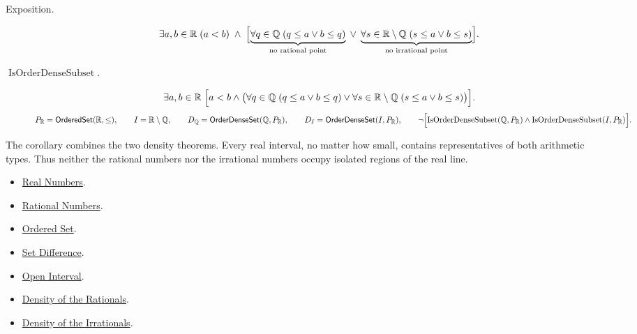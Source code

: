 \begin{remark*}
\begin{description}
\item[Exposition.]
\[
\exists a,b\in\mathbb{R}\;(a<b)
\;\land\;
\Bigl[
\underbrace{\forall q\in\mathbb{Q}\;(q\le a\lor b\le q)}_{\text{no rational point}}
\;\lor\;
\underbrace{\forall s\in\mathbb{R}\setminus\mathbb{Q}\;(s\le a\lor b\le s)}_{\text{no irrational point}}
\Bigr].
\]


  \item[\(\operatorname{IsOrderDenseSubset}.\)]
  \[
\exists a,b\in\mathbb{R}\;
\Bigl[
a<b\land
\bigl(
\forall q\in\mathbb{Q}\;(q\le a\lor b\le q)
\lor
\forall s\in\mathbb{R}\setminus\mathbb{Q}\;(s\le a\lor b\le s)
\bigr)
\Bigr].
\]
\[
P_{\mathbb{R}}=\mathsf{OrderedSet}(\mathbb{R},\leq),\qquad I=\mathbb{R}\setminus\mathbb{Q},\qquad
D_{\mathbb{Q}}=\mathsf{OrderDenseSet}(\mathbb{Q},P_{\mathbb{R}}),\qquad
D_I=\mathsf{OrderDenseSet}(I,P_{\mathbb{R}}),\qquad
\neg\Bigl[
\operatorname{IsOrderDenseSubset}(\mathbb{Q},P_{\mathbb{R}})
\land
\operatorname{IsOrderDenseSubset}(I,P_{\mathbb{R}})
\Bigr].
\]
\end{description}
\end{remark*}

\begin{remark*}[Interpretation]
The corollary combines the two density theorems. Every real interval, no matter how small, contains representatives of both arithmetic types. Thus neither the rational numbers nor the irrational numbers occupy isolated regions of the real line.
\end{remark*}

\begin{dependencies}
\begin{itemize}
\item \hyperref[def:reals]{Real Numbers}.
\item \hyperref[def:rationals]{Rational Numbers}.
\item \hyperref[def:ordered-set]{Ordered Set}.
\item \hyperref[def:set-difference]{Set Difference}.
\item \hyperref[def:open-interval]{Open Interval}.
\item \hyperref[thm:density-of-rationals-in-reals]{Density of the Rationals}.
\item \hyperref[thm:density-of-irrationals-in-reals]{Density of the Irrationals}.
\end{itemize}
\end{dependencies}





